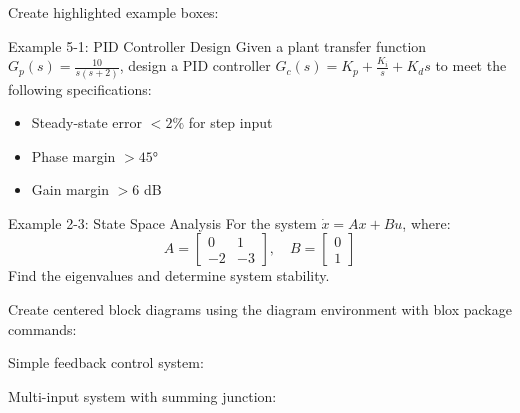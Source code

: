 \documentclass{../homework}
\begin{document}

Create highlighted example boxes:

\begin{example}{Example 5-1: PID Controller Design}
Given a plant transfer function $G_p(s) = \frac{10}{s(s+2)}$, design a PID controller 
$G_c(s) = K_p + \frac{K_i}{s} + K_d s$ to meet the following specifications:
\begin{itemize}
\item Steady-state error $< 2\%$ for step input
\item Phase margin $> 45°$
\item Gain margin $> 6$ dB
\end{itemize}
\end{example}

\begin{example}{Example 2-3: State Space Analysis}
For the system $\dot{x} = Ax + Bu$, where:
$$A = \begin{bmatrix} 0 & 1 \\ -2 & -3 \end{bmatrix}, \quad B = \begin{bmatrix} 0 \\ 1 \end{bmatrix}$$
Find the eigenvalues and determine system stability.
\end{example}


Create centered block diagrams using the diagram environment with blox package commands:

\subproblem
Simple feedback control system:

\begin{diagram}[scale=0.85]
\end{diagram}

\subproblem
Multi-input system with summing junction:

\begin{diagram}[scale=0.8]
\end{diagram}
\end{document}
